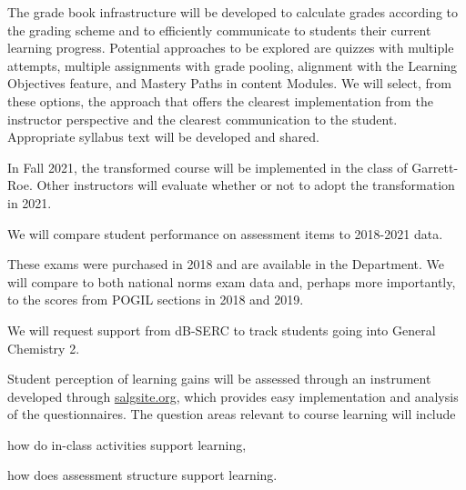 \documentclass[10pt,letterpaper]{article}
\begin{document}
The grade book infrastructure will be developed to calculate grades according to the grading scheme and to efficiently communicate to students their current learning progress. Potential approaches to be explored are quizzes with multiple attempts, multiple assignments with grade pooling, alignment with the Learning Objectives feature, and Mastery Paths in content Modules. We will select, from these options, the approach that offers the clearest implementation from the instructor perspective and the clearest communication to the student. Appropriate syllabus text will be developed and shared.
 

In Fall 2021, the transformed course will be implemented in the class of Garrett-Roe. Other \pogil instructors will evaluate whether or not to adopt the transformation in 2021. 

%
%


 We will compare student performance on assessment items to 2018-2021 data.

 These exams were purchased in 2018 and are available in the Department. We will compare to both national norms exam data and, perhaps more importantly, to the scores from POGIL sections in 2018 and 2019.

 We will request support from dB-SERC to track students going into General Chemistry 2. 

Student perception of learning gains will be assessed through an instrument developed through \url{salgsite.org}, which provides easy implementation and analysis of the questionnaires. The question areas relevant to course learning will include
\begin{enumerate*}[label=\textbf{\arabic*.)}]
  \item how do in-class activities support learning,
\item how does assessment structure support learning.
\end{enumerate*}
\end{document}
